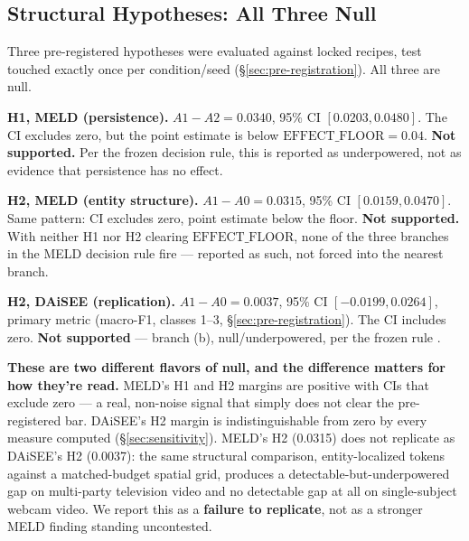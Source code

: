 \label{sec:results}

\subsection{Structural Hypotheses: All Three Null}
Three pre-registered hypotheses were evaluated against locked recipes, test
touched exactly once per condition/seed
(\S\ref{sec:pre-registration}). All three are null.

\textbf{H1, MELD (persistence).}
$A1 - A2 = 0.0340$, 95\% CI $[0.0203, 0.0480]$. The CI excludes zero, but the
point estimate is below $\text{EFFECT\_FLOOR}{=}0.04$. \textbf{Not
supported.} Per the frozen decision rule, this is reported as underpowered,
not as evidence that persistence has no effect.

\textbf{H2, MELD (entity structure).}
$A1 - A0 = 0.0315$, 95\% CI $[0.0159, 0.0470]$. Same pattern: CI excludes
zero, point estimate below the floor. \textbf{Not supported.} With neither H1
nor H2 clearing $\text{EFFECT\_FLOOR}$, none of the three branches in the
MELD decision rule fire
--- reported as such, not forced into the nearest branch.

\textbf{H2, DAiSEE (replication).}
$A1 - A0 = 0.0037$, 95\% CI $[-0.0199, 0.0264]$, primary metric (macro-F1,
classes 1--3, \S\ref{sec:pre-registration}). The CI includes zero.
\textbf{Not supported} --- branch (b), null/underpowered, per the frozen
rule
.

\textbf{These are two different flavors of null, and the difference matters
for how they're read.} MELD's H1 and H2 margins are positive with CIs that
exclude zero --- a real, non-noise signal that simply does not clear the
pre-registered bar. DAiSEE's H2 margin is indistinguishable from zero by
every measure computed (\S\ref{sec:sensitivity}). MELD's H2 (0.0315) does
not replicate as DAiSEE's H2 (0.0037): the same structural comparison,
entity-localized tokens against a matched-budget spatial grid, produces a
detectable-but-underpowered gap on multi-party television video and no
detectable gap at all on single-subject webcam video. We report this as a
\textbf{failure to replicate}, not as a stronger MELD finding standing
uncontested.

